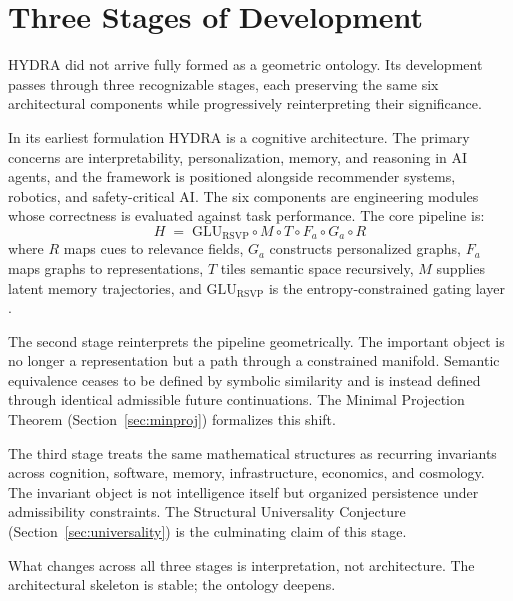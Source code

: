 \documentclass[12pt, a4paper]{article}
\theoremstyle{rsvpstyle}
\theoremstyle{definition}
\begin{document}
\tableofcontents
\clearpage

\section{Three Stages of Development}

HYDRA did not arrive fully formed as a geometric ontology. Its development
passes through three recognizable stages, each preserving the same six
architectural components while progressively reinterpreting their significance.

In its earliest formulation HYDRA is a cognitive architecture. The primary
concerns are interpretability, personalization, memory, and reasoning in AI
agents, and the framework is positioned alongside recommender systems,
robotics, and safety-critical AI. The six components are engineering modules
whose correctness is evaluated against task performance. The core pipeline is:
\begin{equation}\label{eq:pipeline}
  H \;=\; \mathrm{GLU}_{\mathrm{RSVP}} \circ M \circ T \circ F_a \circ G_a \circ R
\end{equation}
where $R$ maps cues to relevance fields, $G_a$ constructs personalized graphs,
$F_a$ maps graphs to representations, $T$ tiles semantic space recursively,
$M$ supplies latent memory trajectories, and $\mathrm{GLU}_{\mathrm{RSVP}}$ is
the entropy-constrained gating layer \citep{MacLane1998}.

The second stage reinterprets the pipeline geometrically. The important object
is no longer a representation but a path through a constrained manifold.
Semantic equivalence ceases to be defined by symbolic similarity and is
instead defined through identical admissible future continuations. The Minimal
Projection Theorem (Section~\ref{sec:minproj}) formalizes this shift.

The third stage treats the same mathematical structures as recurring invariants
across cognition, software, memory, infrastructure, economics, and cosmology.
The invariant object is not intelligence itself but organized persistence under
admissibility constraints. The Structural Universality Conjecture
(Section~\ref{sec:universality}) is the culminating claim of this stage.

What changes across all three stages is interpretation, not architecture.
The architectural skeleton is stable; the ontology deepens.
\end{document}
